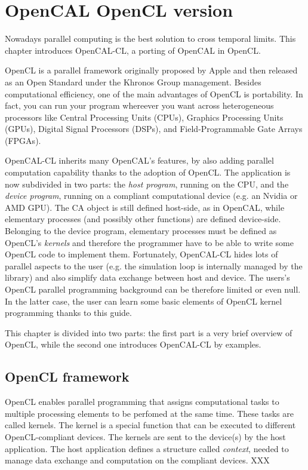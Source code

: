 \chapter{OpenCAL OpenCL version}\label{ch:opencal-cl}


Nowadays parallel computing is the best solution to cross temporal
limits. This chapter introduces OpenCAL-CL, a porting of OpenCAL in
OpenCL.

OpenCL is a parallel framework originally proposed by Apple and then
released as an Open Standard under the Khronos Group
management. Besides computational efficiency, one of the main
advantages of OpenCL is portability. In fact, you can run your program
whereever you want across heterogeneous processors like Central
Processing Units (CPUs), Graphics Processing Units (GPUs), Digital
Signal Processors (DSPs), and Field-Programmable Gate Arrays (FPGAs).

OpenCAL-CL inherits many OpenCAL's features, by also adding parallel
computation capability thanks to the adoption of OpenCL. The
application is now subdivided in two parts: the \emph{host program},
running on the CPU, and the \emph{device program}, running on a
compliant computational device (e.g. an Nvidia or AMD GPU). The CA
object is still defined host-side, as in OpenCAL, while elementary
processes (and possibly other functions) are defined
device-side. Belonging to the device program, elementary processes
must be defined as OpenCL's \emph{kernels} and therefore the
programmer have to be able to write some OpenCL code to implement
them. Fortunately, OpenCAL-CL hides lots of parallel aspects to the
user (e.g. the simulation loop is internally managed by the library)
and also simplify data exchange between host and device. The users's
OpenCL parallel programming background can be therefore limited or
even null. In the latter case, the user can learn some basic elements
of OpenCL kernel programming thanks to this guide.

This chapter is divided into two parts: the first part is a very brief
overview of OpenCL, while the second one introduces OpenCAL-CL by
examples.

\section{OpenCL framework}
OpenCL enables parallel programming that assigns computational tasks
to multiple processing elements to be perfomed at the same time. These
tasks are called kernels. The kernel is a special function that can be
executed to different OpenCL-compliant devices. The kernels are sent
to the device(s) by the host application. The host application defines
a structure called \emph{context}, needed to manage data exchange and
computation on the compliant devices. XXX

